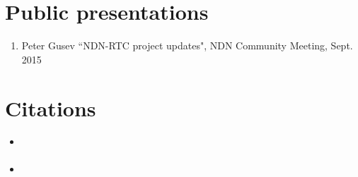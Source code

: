 \documentclass{article}
\begin{document}
\section{Public presentations}
\begin{enumerate}
\item Peter Gusev ``NDN-RTC project updates", NDN Community Meeting, Sept. 2015
\end{enumerate}

\section{Citations}
\begin{itemize}
\item \cite{ndnrtc}
\item \cite{ntsd}
\end{itemize}


{\small

}
\end{document}
